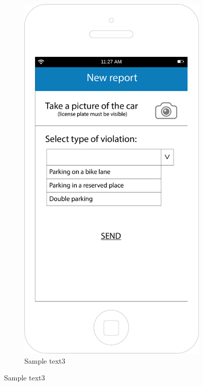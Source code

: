 \documentclass[12pt,a4paper]{report}
\begin{document}
\begin{figure}
\begin{subfigure}{0.5\textwidth}
		\end{subfigure}
		\begin{subfigure}{0.5\textwidth}
			\includegraphics[scale=0.25, center]{Newreport}
			\caption{Sample text3}
			\label{fig:subim2}
		\end{subfigure}
		\end{figure}
\end{document}
